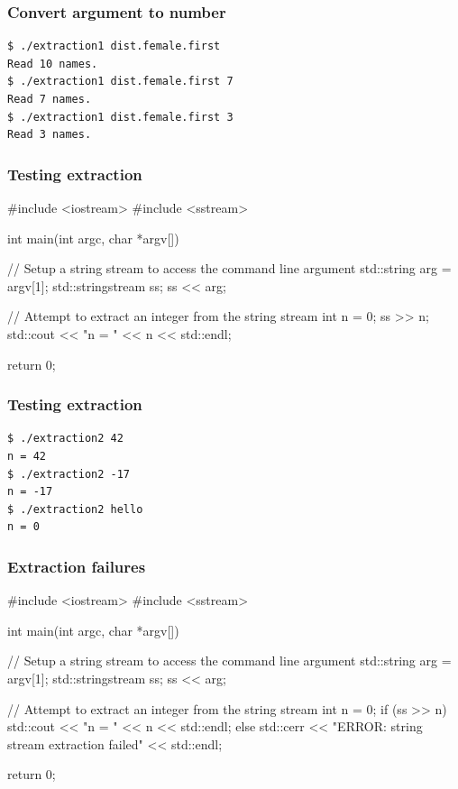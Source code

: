 \documentclass[12pt,letterpaper,twoside]{article}
\begin{document}
\subsubsection{Convert argument to number}
\begin{verbatim}
$ ./extraction1 dist.female.first
Read 10 names.
$ ./extraction1 dist.female.first 7
Read 7 names.
$ ./extraction1 dist.female.first 3
Read 3 names.
\end{verbatim}

\subsubsection{Testing extraction}
\begin{cpp}
#include <iostream>
#include <sstream>

int main(int argc, char *argv[]) {
  // Setup a string stream to access the command line argument
  std::string arg = argv[1];
  std::stringstream ss;
  ss << arg;

  // Attempt to extract an integer from the string stream
  int n = 0;
  ss >> n;
  std::cout << "n = " << n << std::endl;

  return 0;
}
\end{cpp}

\subsubsection{Testing extraction}
\begin{verbatim}
$ ./extraction2 42
n = 42
$ ./extraction2 -17
n = -17
$ ./extraction2 hello
n = 0
\end{verbatim}

\subsubsection{Extraction failures}
\begin{cpp}
#include <iostream>
#include <sstream>

int main(int argc, char *argv[]) {
  // Setup a string stream to access the command line argument
  std::string arg = argv[1];
  std::stringstream ss;
  ss << arg;

  // Attempt to extract an integer from the string stream
  int n = 0;
  if (ss >> n)
    std::cout << "n = " << n << std::endl;
  else
    std::cerr << "ERROR: string stream extraction failed" << std::endl;

  return 0;
}
\end{cpp}
\end{document}
